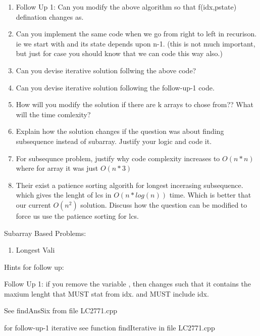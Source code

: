 \begin{pratice}
    
    \begin{enumerate}
        \item Follow Up 1: Can you modify the above algorithm so that f(idx,pstate) defination changes as.  
        \item Can you implement the same code when we go from right to left in recurison. ie we start with  and its state depends upon n-1. (this is not much important, but just for case you should know that we can code this way also.)
        
        \item Can you devise iterative solution follwing the above code?
        \item Can you devise iterative solution following the follow-up-1 code.
        
        \item How will you modify the solution if there are k arrays to chose from?? What will the time comlexity?
        \item Explain how the solution changes if the question was about finding subsequence instead of subarray. Justify your logic and  code it.
        \item For subsequnce problem, justify why code complexity increases to $O(n*n)$ where for array it was just $O(n*3)$
        \item Their exist a patience sorting algorith for longest incerasing subsequence. which gives the lenght of lcs in $O(n*log(n))$ time. Which is better that our current $O(n^2)$ solution. Discuss how the question can be modified to force us use the patience sorting for lcs.
    \end{enumerate}

    \vspace{2mm}
    Subarray Based Problems:
    \begin{enumerate}
        \item Longest Vali
    \end{enumerate}
\end{pratice}

\vspace{1cm}
\begin{pratice}
    Hints for follow up:
    \begin{asparaenum}[(a)]
        \item Follow Up 1: if you remove the variable ,  then  changes such that it contains the maxium lenght that MUST stat from idx. and MUST include idx. 
        \item See findAnsSix from file LC2771.cpp
        \item for follow-up-1 iterative see function findIterative in file LC2771.cpp
    \end{asparaenum}
\end{pratice}

